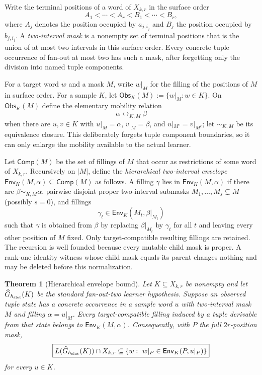 \documentclass[11pt]{article}
\newtheorem{theorem}[definition]{Theorem}
\newcommand{\Obs}{\mathsf{Obs}}
\newcommand{\Comp}{\mathsf{Comp}}
\newcommand{\Env}{\mathsf{Env}}
\begin{document}
Write the terminal positions of a word of $X_{k,r}$ in the surface order
\[
  A_1<\cdots<A_r<B_1<\cdots<B_r,
\]
where $A_j$ denotes the position occupied by $a_{j,i_j}$ and $B_j$ the
position occupied by $b_{j,i_j}$.  A \emph{two-interval mask} is a nonempty
set of terminal positions that is the union of at most two intervals in this
surface order.  Every concrete tuple occurrence of fan-out at most two has
such a mask, after forgetting only the division into named tuple components.

For a target word $w$ and a mask $M$, write $w|_M$ for the filling of the
positions of $M$ in surface order.  For a sample $K$, let
$\Obs_K(M):=\{w|_M:w\in K\}$.  On $\Obs_K(M)$ define the elementary mobility
relation
\[
 \alpha\leftrightarrow_{K,M}\beta
\]
when there are $u,v\in K$ with
$u|_M=\alpha$, $v|_M=\beta$, and $u|_{M^c}=v|_{M^c}$; let
$\sim_{K,M}$ be its equivalence closure.  This deliberately forgets tuple
component boundaries, so it can only enlarge the mobility available to the
actual learner.

Let $\Comp(M)$ be the set of fillings of $M$ that occur as restrictions of
some word of $X_{k,r}$.  Recursively on $|M|$, define the \emph{hierarchical
two-interval envelope} $\Env_K(M,\alpha)\subseteq\Comp(M)$ as follows.  A
filling $\gamma$ lies in $\Env_K(M,\alpha)$ if there are
$\beta\sim_{K,M}\alpha$, pairwise disjoint proper two-interval submasks
$M_1,\ldots,M_s\subsetneq M$ (possibly $s=0$), and fillings
\[
  \gamma_t\in\Env_K(M_t,\beta|_{M_t})
\]
such that $\gamma$ is obtained from $\beta$ by replacing
$\beta|_{M_t}$ by $\gamma_t$ for all $t$ and leaving every other position of
$M$ fixed.  Only target-compatible resulting fillings are retained.  The
recursion is well founded because every mutable child mask is proper.  A
rank-one identity witness whose child mask equals its parent changes nothing
and may be deleted before this normalization.

\begin{theorem}[Hierarchical envelope bound]
\label{thm:hierarchical-envelope}
Let $K\subseteq X_{k,r}$ be nonempty and let $\widehat G_{h_{\rm slot}}(K)$
be the standard fan-out-two learner hypothesis.  Suppose an observed tuple
state has a concrete occurrence in a sample word $u$ with two-interval mask
$M$ and filling $\alpha=u|_M$.  Every target-compatible filling induced by a
tuple derivable from that state belongs to
$\Env_K(M,\alpha)$.  Consequently, with $P$ the full $2r$-position mask,
\[
  \boxed{
  L(\widehat G_{h_{\rm slot}}(K))\cap X_{k,r}
  \subseteq
  \{w:\ w|_P\in\Env_K(P,u|_P)\}
  }
\]
for every $u\in K$.
\end{theorem}
\end{document}
